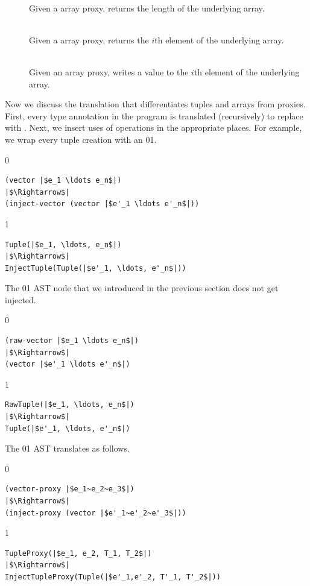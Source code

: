 \documentclass[7x10]{TimesAPriori_MIT}%
\def\racketEd{0}
\def\pythonEd{1}
\def\edition{0}
\newcommand{\racket}[1]{{\if\edition\racketEd{#1}\fi}}
\newcommand{\python}[1]{{\if\edition\pythonEd #1\fi}}
\numberwithin{theorem}{chapter}
\numberwithin{definition}{chapter}
\numberwithin{equation}{chapter}
\begin{document}
{\begin{description}
\item[]\ \\
%
  Given a array proxy, returns the length of the underlying array.
  
\item[]\ \\
%
  Given a array proxy, returns the $i$th element of the underlying
  array.

\item[]\ \\
%  
    Given an array proxy, writes a value to the $i$th element of the
    underlying array.
\end{description}

\fi}

Now we discuss the translation that differentiates tuples and arrays
from proxies. First, every type annotation in the program is
translated (recursively) to replace \TUPLETYPENAME{} with \PTUPLETYNAME{}.
Next, we insert uses of \PTUPLETYNAME{} operations in the appropriate
places. For example, we wrap every tuple creation with an
\racket{}\python{}.
{\if\edition\racketEd    
\begin{lstlisting}
(vector |$e_1 \ldots e_n$|)
|$\Rightarrow$|
(inject-vector (vector |$e'_1 \ldots e'_n$|))
\end{lstlisting}
\fi}
{\if\edition\pythonEd    
\begin{lstlisting}
Tuple(|$e_1, \ldots, e_n$|)
|$\Rightarrow$|
InjectTuple(Tuple(|$e'_1, \ldots, e'_n$|))
\end{lstlisting}
\fi}
The \racket{}\python{}
AST node that we introduced in the previous
section does not get injected.
{\if\edition\racketEd    
\begin{lstlisting}
(raw-vector |$e_1 \ldots e_n$|)
|$\Rightarrow$|
(vector |$e'_1 \ldots e'_n$|)
\end{lstlisting}
\fi}
{\if\edition\pythonEd    
\begin{lstlisting}
RawTuple(|$e_1, \ldots, e_n$|)
|$\Rightarrow$|
Tuple(|$e'_1, \ldots, e'_n$|)
\end{lstlisting}
\fi}

The \racket{}\python{} AST translates as follows.
{\if\edition\racketEd    
\begin{lstlisting}
(vector-proxy |$e_1~e_2~e_3$|)
|$\Rightarrow$|
(inject-proxy (vector |$e'_1~e'_2~e'_3$|))
\end{lstlisting}
\fi}
{\if\edition\pythonEd
\begin{lstlisting}
TupleProxy(|$e_1, e_2, T_1, T_2$|)
|$\Rightarrow$|
InjectTupleProxy(Tuple(|$e'_1,e'_2, T'_1, T'_2$|))
\end{lstlisting}
\fi}
\end{document}

